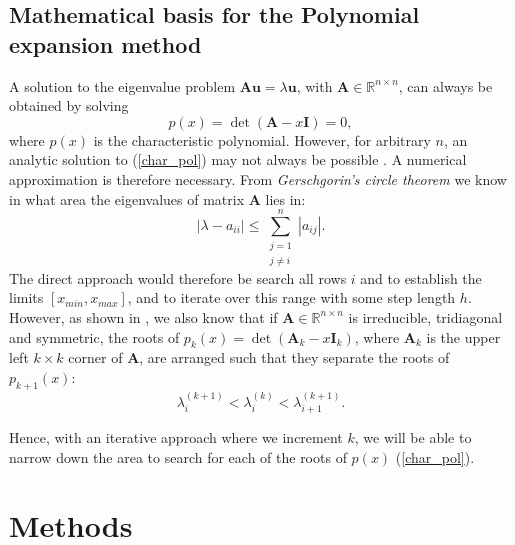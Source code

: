 \documentclass[]{article}
\begin{document}
\subsection{Mathematical basis for the Polynomial expansion method}
A solution to the eigenvalue problem $\mathbf{Au} = \lambda \mathbf{u}$, with $\mathbf{A} \in \mathbb{R}^{n \times n}$, can always be obtained by solving 
\begin{equation}
\label{char_pol}
p(x) = \det(\mathbf{A} - x\mathbf{I}) = 0,
\end{equation}
where $p(x)$ is the characteristic polynomial. However, for arbitrary $n$, an analytic solution to (\ref{char_pol}) may not always be possible \cite{fys4150-notes}. A numerical approximation is therefore necessary. From \textit{Gerschgorin's circle theorem} \cite{mat-inf4130} we know in what area the eigenvalues of matrix $\mathbf{A}$ lies in:
\[
|\lambda - a_{ii}| \leq \sum_{\substack{j=1 \\ j \neq i}}^{n} |a_{ij}|.
\]
The direct approach would therefore be search all rows $i$ and to establish the limits $[x_{min}, x_{max}]$, and to iterate over this range with some step length $h$. However, as shown in \cite{mat-inf4130}, we also know that if $\mathbf{A} \in \mathbb{R}^{n \times n}$ is irreducible, tridiagonal and symmetric, the roots of $p_k(x) = \det(\mathbf{A}_k - x\mathbf{I}_k)$, where $\mathbf{A}_k$ is the upper left $k \times k$ corner of $\mathbf{A}$, are arranged such that they separate the roots of $p_{k+1}(x)$:
\[
\lambda_i^{(k+1)} < \lambda_i^{(k)} < \lambda_{i+1}^{(k+1)}.
\]

Hence, with an iterative approach where we increment $k$, we will be able to narrow down the area to search for each of the roots of $p(x)$ (\ref{char_pol}).

\section{Methods}
\end{document}
